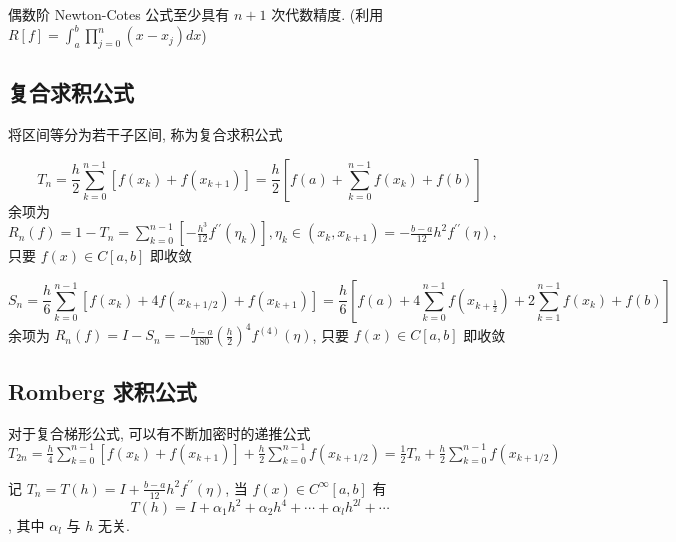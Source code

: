 \documentclass[10pt]{yerbaformat}
\begin{document}
\begin{theorem}
    偶数阶 Newton-Cotes 公式至少具有 $n+1$ 次代数精度. (利用 $R[f]=\int_{a}^{b} \prod_{j=0}^{n}\left(x-x_{j}\right) d x$)
\end{theorem}

\subsection{复合求积公式}

\par 将区间等分为若干子区间, 称为复合求积公式
\begin{definition}[复合梯形公式]
    $$T_{n}=\frac{h}{2} \sum_{k=0}^{n-1}\left[f\left(x_{k}\right)+f\left(x_{k+1}\right)\right]=\frac{h}{2}\left[f(a)+\sum_{k=0}^{n-1} f\left(x_{k}\right)+f(b)\right]$$ 余项为 $R_{n}(f)=1-T_{n}=\sum_{k=0}^{n-1}\left[-\frac{h^{3}}{12} f^{\prime \prime}\left(\eta_{k}\right)\right], \eta_{k} \in\left(x_{k}, x_{k+1}\right) =-\frac{b-a}{12} h^{2} f^{\prime \prime}(\eta) $, 只要 $f(x) \in C[a, b]$ 即收敛
\end{definition}

\begin{definition}[复合辛普森公式]
    $$S_{n}=\frac{h}{6} \sum_{k=0}^{n-1}\left[f\left(x_{k}\right)+4 f\left(x_{k+1 / 2}\right)+f\left(x_{k+1}\right)\right]=\frac{h}{6}\left[f(a)+4 \sum_{k=0}^{n-1} f\left(x_{k+\frac{1}{2}}\right)+2 \sum_{k=1}^{n-1} f\left(x_{k}\right)+f(b)\right]$$ 余项为 $R_{n}(f)=I-S_{n}=-\frac{b-a}{180}\left(\frac{h}{2}\right)^{4} f^{(4)}(\eta)$, 只要 $f(x) \in C[a, b]$ 即收敛
\end{definition}

\subsection{Romberg 求积公式}
\par 对于复合梯形公式, 可以有不断加密时的递推公式 $T_{2 n}=\frac{h}{4} \sum_{k=0}^{n-1}\left[f\left(x_{k}\right)+f\left(x_{k+1}\right)\right]+\frac{h}{2} \sum_{k=0}^{n-1} f\left(x_{k+1 / 2}\right)=\frac{1}{2} T_{n}+\frac{h}{2} \sum_{k=0}^{n-1} f\left(x_{k+1 / 2}\right)$

\begin{theorem}
    记 $T_{n}=T(h)=I+\frac{b-a}{12} h^{2} f^{\prime \prime}(\eta)$, 当 $f(x) \in C^{\infty}[a, b]$ 有 $$
        T(h)=I+\alpha_{1} h^{2}+\alpha_{2} h^{4}+\cdots+\alpha_{l} h^{2 l}+\cdots
    $$, 其中 $\alpha_{l}$ 与 $h$ 无关.
\end{theorem}
\end{document}

